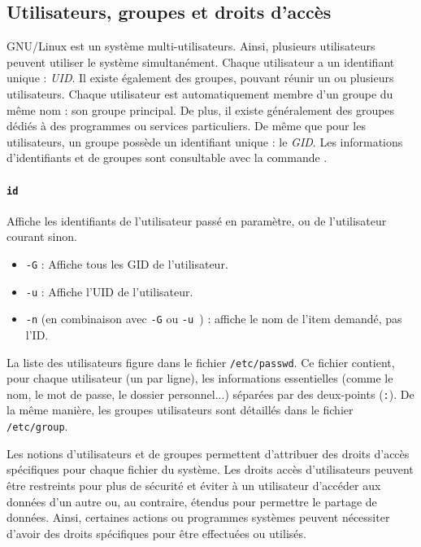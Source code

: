 \subsection{Utilisateurs, groupes et droits d'accès} \label{sec:users}
\vspace{-2mm}
GNU/Linux est un système multi-utilisateurs. Ainsi, plusieurs utilisateurs peuvent utiliser le système simultanément. Chaque utilisateur a un identifiant unique : \textit{UID}. Il existe également des groupes, pouvant réunir un ou plusieurs utilisateurs. Chaque utilisateur est automatiquement membre d'un groupe du même nom : son groupe principal. De plus, il existe généralement des groupes dédiés à des programmes ou services particuliers. De même que pour les utilisateurs, un groupe possède un identifiant unique : le \textit{GID}. Les informations d'identifiants et de groupes sont consultable avec la commande .

\paragraph{\texttt{id}} 
Affiche les identifiants de l'utilisateur passé en paramètre, ou de l'utilisateur courant sinon.
\begin{itemize}
    \item \texttt{-G} : Affiche tous les GID de l'utilisateur.
    \item \texttt{-u} : Affiche l'UID de l'utilisateur.
    \item \texttt{-n} (en combinaison avec \texttt{-G} ou \texttt{-u }) : affiche le nom de l'item demandé, pas l'ID.
\end{itemize}\vspace{\baselineskip}

La liste des utilisateurs figure dans le fichier \texttt{/etc/passwd}. Ce fichier contient, pour chaque utilisateur (un par ligne), les informations essentielles (comme le nom, le mot de passe, le dossier personnel...) séparées par des deux-points (\texttt{:}). De la même manière, les groupes utilisateurs sont détaillés dans le fichier \texttt{/etc/group}.

Les notions d'utilisateurs et de groupes permettent d'attribuer des droits d'accès spécifiques pour chaque fichier du système. Les droits accès d'utilisateurs peuvent être restreints pour plus de sécurité et éviter à un utilisateur d'accéder aux données d'un autre ou, au contraire, étendus pour permettre le partage de données. Ainsi, certaines actions ou programmes systèmes peuvent nécessiter d'avoir des droits spécifiques pour être effectuées ou utilisés.

